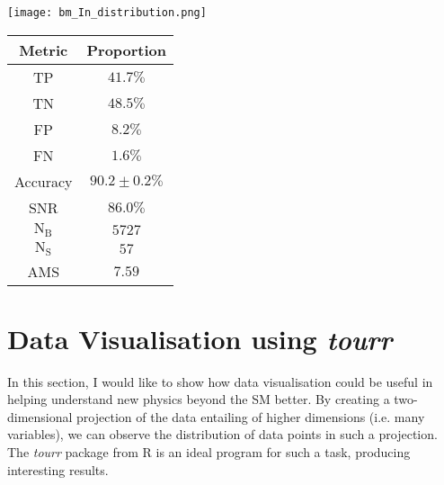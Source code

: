 \begin{minipage}{\textwidth}
  \begin{minipage}[htbp]{0.65\textwidth}
    \centering
    \texttt{[image: bm\_In\_distribution.png]}
    \label{fig:dist_bm_in}
  \end{minipage}
  \hfill
  \begin{minipage}[htbp]{0.34\textwidth}
        \centering
        \begin{tabular}{c|c} 
        \toprule
        Metric & Proportion \\
        \midrule
        \rowcolor{gray!6} TP & $41.7 \%$ \\
        TN & $48.5 \%$ \\
        \rowcolor{gray!6} FP & $8.2 \%$\\
        FN & $1.6 \%$ \\
        \rowcolor{gray!6} Accuracy & $90.2 \pm 0.2 \%$ \\
        SNR & $86.0 \%$ \\
        \midrule
        \rowcolor{gray!6} $\text{N}_\text{B}$ & $5727$ \\
        $\text{N}_\text{S}$ & $57$ \\
        \rowcolor{gray!6} AMS & $7.59$ \\
        \bottomrule
        \end{tabular}
        \label{tab:Values_in}
    \end{minipage}
\end{minipage}

\section{Data Visualisation using \textit{tourr}}

In this section, I would like to show how data visualisation could be useful in helping understand new physics beyond the SM better. By creating a two-dimensional projection of the data entailing of higher dimensions (i.e. many variables), we can observe the distribution of data points in such a projection. The \textit{tourr} package from R is an ideal program for such a task, producing interesting results. 


